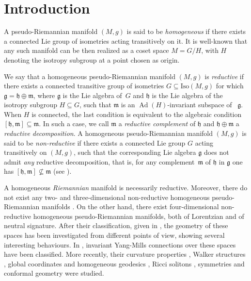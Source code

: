 \documentclass{amsart}
\theoremstyle{plain}
\theoremstyle{remark}
\newcommand\g{{\mathfrak{g}}}
\newcommand\h{{\mathfrak{h}}}
\newcommand\m{{\mathfrak{m}}}
\newcommand\Ad{\operatorname{Ad}}
\begin{document}
\section{Introduction}
A pseudo-Riemannian manifold $(M,g)$ is said to be \textit{homogeneous} if there exists a  connected Lie group of isometries acting transitively on it. 
It is well-known that any such manifold can be then realized as a coset space $M=G/H$, with $H$ denoting the isotropy subgroup at a point chosen as origin. 

We say that a homogeneous pseudo-Riemannian manifold $(M,g)$ is \emph{reductive} if there exists a connected transitive group of isometries $G\subseteq \mathrm{Iso}(M,g)$ for which $\g =\h \oplus \m$, where $\g$ is the Lie algebra of~$G$ and $\h$ is the Lie algebra of the isotropy subgroup $H\subseteq G$, such that $\m$ is an $\Ad(H)$-invariant subspace of ~$\g$. When $H$ is connected, the last condition is equivalent to the algebraic condition $[\h ,\m ]\subseteq \m$. In such a case, we call $\m$  a \emph{reductive complement} of $\h$ and $\h \oplus \m$ a {\em reductive decomposition}. A homogeneous pseudo-Riemannian manifold $(M,g)$ is said to be {\em non-reductive} if there exists a connected Lie group $G$ acting transitively on $(M,g)$, such that the corresponding Lie algebra $\g$ does not admit {\em any} reductive decomposition, that is, for any complement~$\m$ of $\h$ in $\g$ one has $[\h,\m]\nsubseteq \m$ (see  \cite{FR}). %

A homogeneous {\em Riemannian} manifold is necessarily reductive. Moreover, there do not exist any two- and three-dimensional non-reductive homogeneous pseudo-Riemannian manifolds \cite{FR}. On the other hand, there exist four-dimensional non-reductive homogeneous pseudo-Riemannian manifolds, both of Lorentzian and of neutral signature. After their classification, given in \cite{FR}, the geometry of these spaces has been investigated from different points of view, showing several interesting behaviours. In \cite{The}, invariant Yang-Mills connections over these spaces have been classified. More recently, their curvature properties \cite{CF}, Walker structures \cite{CZ}, global coordinates and homogeneous geodesics \cite{CFZ}, Ricci solitons \cite{CZ2}, symmetries \cite{CZ3} and conformal geometry \cite{GRR} were studied.
 
\end{document}
